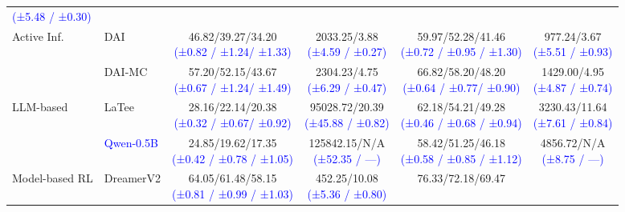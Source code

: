 \documentclass{article} %
\newcommand{\revise}[1]{\textcolor{blue}{#1}}
\begin{document}
\begin{table}[H]
\begin{tabular}{l l c c c c}
{\revise{{\footnotesize (±5.48 / ±0.30)}}} \\
\multirow{2}{*}{Active Inf.}
& DAI      & \makecell[c]{46.82/39.27/34.20\\[-1pt]
\revise{{\footnotesize (±0.82 / ±1.24/ ±1.33)}}} & \makecell[c]{2033.25/3.88\\[-1pt]
\revise{{\footnotesize (±4.59 / ±0.27)}}} & \makecell[c]{59.97/52.28/41.46\\[-1pt]
\revise{{\footnotesize (±0.72 / ±0.95 / ±1.30)}}} & \makecell[c]{977.24/3.67\\[-1pt]
\revise{{\footnotesize (±5.51 / ±0.93)}}} \\
& DAI-MC   & \makecell[c]{57.20/52.15/43.67\\[-1pt]
\revise{{\footnotesize (±0.67 / ±1.24/ ±1.49)}}} & \makecell[c]{2304.23/4.75\\[-1pt]
\revise{{\footnotesize (±6.29 / ±0.47)}}} & \makecell[c]{66.82/58.20/48.20\\[-1pt]
\revise{{\footnotesize (±0.64 / ±0.77/ ±0.90)}}} & \makecell[c]{1429.00/4.95\\[-1pt]
\revise{{\footnotesize (±4.87 / ±0.74)}}} \\
\multirow{2}{*}{LLM-based}
& LaTee    & \makecell[c]{28.16/22.14/20.38\\[-1pt]
\revise{{\footnotesize (±0.32 / ±0.67/ ±0.92)}}} & \makecell[c]{95028.72/20.39\\[-1pt]
\revise{{\footnotesize (±45.88 / ±0.82)}}} & \makecell[c]{62.18/54.21/49.28\\[-1pt]
\revise{{\footnotesize (±0.46 / ±0.68 / ±0.94)}}} & \makecell[c]{3230.43/11.64\\[-1pt]
\revise{{\footnotesize (±7.61 / ±0.84)}}} \\
& \revise{Qwen-0.5B} & \makecell[c]{24.85/19.62/17.35\\[-1pt]
\revise{{\footnotesize (±0.42 / ±0.78 / ±1.05)}}} & \makecell[c]{125842.15/N/A\\[-1pt]
\revise{{\footnotesize (±52.35 / ---)}}} & \makecell[c]{58.42/51.25/46.18\\[-1pt]
\revise{{\footnotesize (±0.58 / ±0.85 / ±1.12)}}} & \makecell[c]{4856.72/N/A\\[-1pt]
\revise{{\footnotesize (±8.75 / ---)}}} \\
Model-based RL & DreamerV2 & \makecell[c]{64.05/61.48/58.15\\[-1pt]
\revise{{\footnotesize (±0.81 / ±0.99 / ±1.03)}}} & \makecell[c]{452.25/10.08\\[-1pt]
\revise{{\footnotesize (±5.36 / ±0.80)}}} & \makecell[c]{76.33/72.18/69.47\\[-1pt]
}
\end{tabular}
\end{table}
\end{document}
